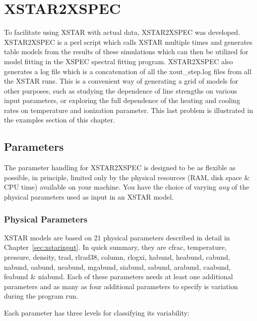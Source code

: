 \chapter{XSTAR2XSPEC}
\label{sec:xstar2xspec}

To facilitate using XSTAR with actual data, XSTAR2XSPEC was 
developed.  XSTAR2XSPEC is a perl script which calls XSTAR multiple times 
and generates table models from the results of these simulations 
which can then be utilized for model fitting in the XSPEC spectral 
fitting program.  XSTAR2XSPEC also generates a log file which is a concatenation 
of all the xout\_step.log files from all the XSTAR runs.  This is a convenient  
way of generating a grid of models for other purposes, such as studying 
the dependence of line strengths on various input parameters, or exploring 
the full dependence of the heating and cooling rates on temperature 
and ionization parameter.  This last problem is illustrated in the 
examples section of this chapter.

\section{Parameters}

The parameter handling for XSTAR2XSPEC is designed to be as flexible 
as possible, in principle, limited only by the physical resources 
(RAM, disk space \& CPU time) available on your machine.  You have the choice of 
varying {\it any} of the physical parameters used as input in an XSTAR 
model.

\subsection{Physical Parameters}

XSTAR models are based on 21 physical parameters described in detail 
in Chapter~\ref{sec:xstarinput}.  In quick summary, they are 
cfrac, temperature, pressure, density, trad, rlrad38, column, rlogxi,
habund, heabund, cabund, nabund, oabund, neabund, mgabund, siabund, sabund, 
arabund, caabund, feabund \& niabund.  Each of these parameters needs 
at least one additional parameters and as many as four additional 
parameters to specify is variation during the program run.

Each parameter has three levels for classifying its variability:

